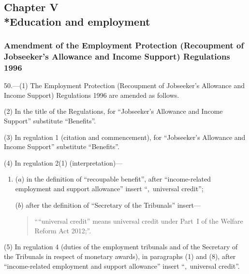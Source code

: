 \documentclass[12pt,a4paper]{article}
\begin{document}
\subsection[Chapter V --- Education and employment]{Chapter V\\*Education and employment}

\renewcommand\parthead{--- Part III Chapter V}

\subsubsection[50. Amendment of the Employment Protection (Recoupment of Jobseeker’s Allowance and Income Support) Regulations 1996]{Amendment of the Employment Protection (Recoupment of Jobseeker’s Allowance and Income Support) Regulations 1996}

50.—(1) The Employment Protection (Recoupment of Jobseeker’s Allowance and Income Support) Regulations 1996 are amended as follows.

(2) In the title of the Regulations, for “Jobseeker’s Allowance and Income Support” substitute “Benefits”.

(3) In regulation 1 (citation and commencement), for “Jobseeker’s Allowance and Income Support” substitute “Benefits”.

(4) In regulation 2(1) (interpretation)—
\begin{enumerate}\item[]
($a$) in the definition of “recoupable benefit”, after “income-related employment and support allowance” insert “,~universal credit”;

($b$) after the definition of “Secretary of the Tribunals” insert—
\begin{quotation}
““universal credit” means universal credit under Part~I of the Welfare Reform Act 2012;”.
\end{quotation}
\end{enumerate}

(5) In regulation 4 (duties of the employment tribunals and of the Secretary of the Tribunals in respect of monetary awards), in paragraphs (1) and (8), after “income-related employment and support allowance” insert “,~universal credit”.
\end{document}
